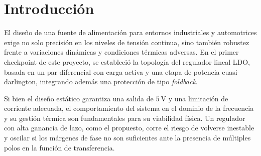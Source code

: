 \documentclass[a4paper,12pt]{article}
\begin{document}
\vspace{2em}
\thispagestyle{empty}

\begin{abstract}
El presente informe detalla el desarrollo del segundo \textit{checkpoint} del proyecto integrador, enfocado en asegurar la estabilidad dinámica y la integridad física del regulador lineal LDO diseñado previamente. 

En primer lugar, se realiza un análisis exhaustivo de la respuesta en frecuencia mediante el estudio de los diagramas de Bode para los lazos de realimentación de tensión y corriente. Se evalúan los márgenes de fase y de ganancia para determinar la estabilidad del sistema y, en caso de ser necesario, se proponen e implementan redes de compensación de frecuencia que garanticen un comportamiento robusto frente a transitorios. 

Posteriormente, se aborda el análisis térmico del regulador, considerando las condiciones críticas de operación y la potencia disipada por el transistor de paso. Este estudio permite dimensionar y seleccionar el disipador de calor adecuado para mantener las temperaturas de juntura dentro de los límites de seguridad. 

Finalmente, se presenta el diseño definitivo del circuito impreso (PCB) en entorno CAD, optimizando el ruteo de las pistas de potencia y señal, así como la disposición de los componentes para facilitar la posterior implementación física y validación experimental del sistema.
\end{abstract}

\newpage

\tableofcontents

\newpage

\section{Introducción}
El diseño de una fuente de alimentación para entornos industriales y automotrices exige no solo precisión en los niveles de tensión continua, sino también robustez frente a variaciones dinámicas y condiciones térmicas adversas. En el primer checkpoint de este proyecto, se estableció la topología del regulador lineal LDO, basada en un par diferencial con carga activa y una etapa de potencia cuasi-darlington, integrando además una protección de tipo \textit{foldback}.

Si bien el diseño estático garantiza una salida de $\SI{5}{\volt}$ y una limitación de corriente adecuada, el comportamiento del sistema en el dominio de la frecuencia y su gestión térmica son fundamentales para su viabilidad física. Un regulador con alta ganancia de lazo, como el propuesto, corre el riesgo de volverse inestable y oscilar si los márgenes de fase no son suficientes ante la presencia de múltiples polos en la función de transferencia.
\end{document}
